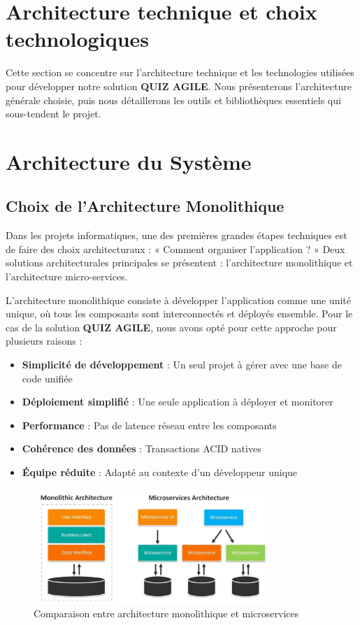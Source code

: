 \documentclass[12pt,a4paper]{report}
\begin{document}
\section{Architecture technique et choix technologiques}

Cette section se concentre sur l'architecture technique et les technologies utilisées pour développer notre solution \textbf{QUIZ AGILE}. Nous présenterons l'architecture générale choisie, puis nous détaillerons les outils et bibliothèques essentiels qui sous-tendent le projet.

\section{Architecture du Système}

\subsection{Choix de l'Architecture Monolithique}

Dans les projets informatiques, une des premières grandes étapes techniques est de faire des choix architecturaux : « Comment organiser l'application ? » Deux solutions architecturales principales se présentent : l'architecture monolithique et l'architecture micro-services.

L'architecture monolithique consiste à développer l'application comme une unité unique, où tous les composants sont interconnectés et déployés ensemble. Pour le cas de la solution \textbf{QUIZ AGILE}, nous avons opté pour cette approche pour plusieurs raisons :

\begin{itemize}
\item \textbf{Simplicité de développement} : Un seul projet à gérer avec une base de code unifiée
\item \textbf{Déploiement simplifié} : Une seule application à déployer et monitorer
\item \textbf{Performance} : Pas de latence réseau entre les composants
\item \textbf{Cohérence des données} : Transactions ACID natives
\item \textbf{Équipe réduite} : Adapté au contexte d'un développeur unique
\end{itemize}

\begin{figure}[H]
\centering
\includegraphics[width=0.8\textwidth]{latex_media/media/image15.jpeg}
\caption{Comparaison entre architecture monolithique et microservices}
\label{fig:comparaison-architectures-tech}
\end{figure}
\end{document}
